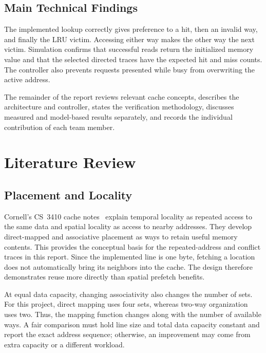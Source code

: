 \documentclass[conference]{IEEEtran}
\begin{document}
\subsection{Main Technical Findings}

The implemented lookup correctly gives preference to a hit, then an
invalid way, and finally the LRU victim. Accessing either way makes the
other way the next victim. Simulation confirms that successful reads
return the initialized memory value and that the selected directed
traces have the expected hit and miss counts. The controller also
prevents requests presented while busy from overwriting the active
address.

The remainder of the report reviews relevant cache concepts, describes
the architecture and controller, states the verification methodology,
discusses measured and model-based results separately, and records the
individual contribution of each team member.

\section{Literature Review}

\subsection{Placement and Locality}

Cornell's CS~3410 cache notes~\cite{cornell} explain temporal locality
as repeated access to the same data and spatial locality as access to
nearby addresses. They develop direct-mapped and associative placement
as ways to retain useful memory contents. This provides the conceptual
basis for the repeated-address and conflict traces in this report.
Since the implemented line is one byte, fetching a location does not
automatically bring its neighbors into the cache. The design therefore
demonstrates reuse more directly than spatial prefetch benefits.

At equal data capacity, changing associativity also changes the number
of sets. For this project, direct mapping uses four sets, whereas
two-way organization uses two. Thus, the mapping function changes along
with the number of available ways. A fair comparison must hold line
size and total data capacity constant and report the exact address
sequence; otherwise, an improvement may come from extra capacity or a
different workload.
\end{document}
